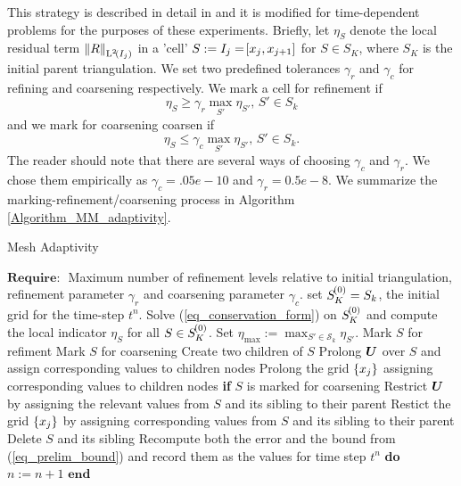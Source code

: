 \documentclass[final]{amsart}
\renewcommand{\vec}[1]{\geovec{#1}}
\numberwithin{equation}{section}
\begin{document}
This strategy is described in detail in  \cite[\S1.5]{schmidt2005design} and it is modified for time-dependent problems for the purposes of these experiments.  Briefly, let $\eta_S$ denote the local residual term $\left\|R\right\|_{\operatorname L^{2}\!\left({I_j}\right)}$ in a 'cell' $S:=I_j=\!\left[{x_j, x_{j+1}}\right]$ for $S\in S_K$, where $S_K$ is the initial parent triangulation.  We set two predefined tolerances $\gamma_r$ and $\gamma_c$ for refining and coarsening respectively.  We mark a cell for refinement if
\begin{equation}
\eta_S \geq \gamma_r \max_{S'} \eta_{S'}, \, S' \in S_k
\end{equation}
and we mark for coarsening coarsen if 
\begin{equation}
\eta_S \leq \gamma_c \max_{S'} \eta_{S'}, \, S' \in S_k.
\end{equation}
The reader should note that there are several ways of choosing $\gamma_c$ and $\gamma_r$.  We chose them empirically as $\gamma_c = .05e-10$ and $\gamma_r= 0.5e-8$.  We summarize the marking-refinement/coarsening process in Algorithm \ref{Algorithm_MM_adaptivity}.

\begin{algorithm}[H]
	\caption{Mesh Adaptivity}\label{Algorithm_MM_adaptivity}
	\begin{algorithmic}
		\State $\textbf{Require: }$ Maximum number of refinement levels relative to initial triangulation, refinement parameter $\gamma_r$ and coarsening parameter $\gamma_c$.
		\State set $S^{\!\left({0}\right)}_K=S_k$, the initial grid for the time-step  $t^n$.
		\State Solve (\ref{eq_conservation_form})  on $S^{\!\left({0}\right)}_K$ and compute the local indicator $\eta_S$ for all $S\in S^{\!\left({0}\right)}_K$.  
		\State Set $\eta_{\max}:=\max_{S'\in\mathcal{S}_k}\eta_{S'}$.
		\State Mark $S$ for refiment
		\EndIf
		\EndFor
		\State Mark $S$ for coarsening
		\EndIf
		\EndIf
		\EndFor
		\State Create two children of $S$
		\State Prolong $\vec{U}$ over $S$ and assign corresponding values to children nodes
		\State Prolong the grid $\left\lbrace x_j\right\rbrace$ assigning corresponding values to children nodes
		\Else \textbf{if} {$S$ is marked for coarsening}
		\State Restrict $\vec{U}$ by assigning the relevant values from $S$ and its sibling to their parent
		\State Restict the grid $\left\lbrace x_j\right\rbrace$ by assigning corresponding values from $S$ and its sibling to their parent
		\State Delete $S$ and its sibling
		\EndIf
		\EndFor
		\State Recompute both the error and the bound from (\ref{eq_prelim_bound}) and record them as the values for  time step $t^n$
		\State  \textbf{do} $n:=n+1$
		\EndWhile
		\State $\textbf{end}$
	\end{algorithmic}
\end{algorithm}
\end{document}
